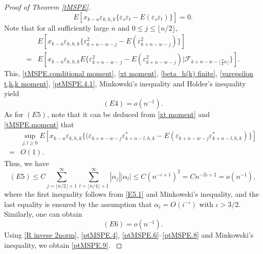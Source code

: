 \documentclass[ejsv2]{imsart}
\theoremstyle{plain}
\theoremstyle{definition}
\theoremstyle{remark}
\begin{document}
\begin{proof}[Proof of Theorem \ref{tMSPE}]
{\begin{equation}
E[x_{k-u}\varepsilon_{k,h,k}\{\varepsilon_{s}\varepsilon_{t}-E(\varepsilon_{s}\varepsilon_{t})\}]=0.
\end{equation}
Note that for all sufficiently large $n$ and $0\leq j\leq \lfloor n/2\rfloor$,
\begin{equation}\label{ptMSPE.5}
\begin{split}
     & E[x_{k-u}\varepsilon_{k,h,k}\{\varepsilon_{k+n-w-j}^2-E(\varepsilon_{k+n-w-j}^2)\}] \\
    = & E[x_{k-u}\varepsilon_{k,h,k}E\{\varepsilon_{k+n-w-j}^2-E(\varepsilon_{k+n-w-j}^2)|\mathcal{F}_{k+n-w-\lfloor\frac{3}{4}n\rfloor}\}].
\end{split}
\end{equation}
This, \eqref{tMSPE.conditional moment}, \eqref{xt moment}, \eqref{beta_h(k) finite}, \eqref{varepsilon t,h,k moment}, \eqref{ptMSPE.4.1}, Minkowski's inequality and H$\ddot{\mathrm{o}}$lder's inequality yield
\begin{equation}\label{ptMSPE.6}
(E4)=o(n^{-1}).
\end{equation}
As for $(E5)$, note that it can be deduced from \eqref{xt moment} and \eqref{tMSPE.moment} that
\begin{equation}\label{E5.1}
\begin{split}
     &\sup\limits_{j,l\geq0}E[x_{k-u}\varepsilon_{k,h,k}\{(\varepsilon_{k+n-w-j}\varepsilon^\ast_{k+n-l,h,k}-E(\varepsilon_{k+n-w-j}\varepsilon^\ast_{k+n-l,h,k})\}] \\
   =  & O(1).
\end{split}
\end{equation}
Thus, we have
\begin{equation}\label{ptMSPE.7}
(E5)\leq C\sum_{j=\lfloor n/2\rfloor+1}^{\infty}\sum_{l=\lfloor n/4\rfloor+1}^{\infty}|\alpha_j||\alpha_l|\leq C(n^{-\iota+1})^2=Cn^{-2\iota+2}=o(n^{-1}),
\end{equation}
where the first inequality follows from \eqref{E5.1} and Minkowski's inequality, and the last equality is ensured by the assumption that $\alpha_i=O(i^{-\iota})$ with $\iota>3/2$. Similarly, one can obtain
\begin{equation}\label{ptMSPE.8}
(E6)=o(n^{-1}).
\end{equation}
Using \eqref{R invese 2norm}, \eqref{ptMSPE.4}, \eqref{ptMSPE.6}--\eqref{ptMSPE.8} and Minkowski's inequality, we obtain \eqref{ptMSPE.9}.
}
\end{proof}
\end{document}
